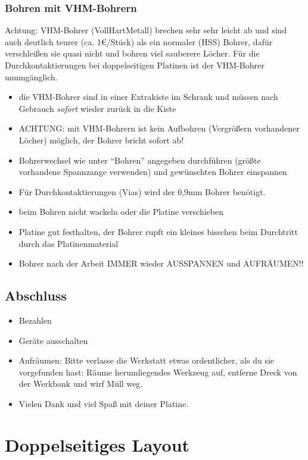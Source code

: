 \documentclass{\basedir/fablab-document}
\begin{document}
\subsubsection{Bohren mit VHM-Bohrern}
Achtung: VHM-Bohrer (VollHartMetall) brechen sehr sehr leicht ab und sind auch deutlich teurer (ca. 1€/Stück) als ein normaler (HSS) Bohrer, dafür verschleißen sie quasi nicht und bohren viel sauberere Löcher.
Für die Durchkontaktierungen bei doppelseitigen Platinen ist der VHM-Bohrer unumgänglich.
\begin{itemize}
\item die VHM-Bohrer sind in einer Extrakiste im Schrank und müssen nach Gebrauch \emph{sofort} wieder zurück in die Kiste
\item ACHTUNG: mit VHM-Bohrern ist kein Aufbohren (Vergrößern vorhandener Löcher) möglich, der Bohrer bricht sofort ab!
\item Bohrerwechsel wie unter ``Bohren'' angegeben durchführen (größte vorhandene Spannzange verwenden) und gewünschten Bohrer einspannen
\item Für Durchkontaktierungen (Vias) wird der 0,9mm Bohrer benötigt.
\item beim Bohren nicht wackeln oder die Platine verschieben
\item Platine gut festhalten, der Bohrer rupft ein kleines bisschen beim Durchtritt durch das Platinenmaterial
\item Bohrer nach der Arbeit IMMER wieder AUSSPANNEN und AUFRÄUMEN!!
\end{itemize}




\subsection{Abschluss}
\newcommand{\abschluss}{
\begin{itemize}
 \item Bezahlen
 \item Geräte ausschalten
 \item Aufräumen: Bitte verlasse die Werkstatt etwas ordentlicher, als du sie vorgefunden hast: Räume herumliegendes Werkzeug auf, entferne Dreck von der Werkbank und wirf Müll weg.
 \item Vielen Dank und viel Spaß mit deiner Platine.
\end{itemize}}

\abschluss

\newpage


\section{Doppelseitiges Layout}
\end{document}
